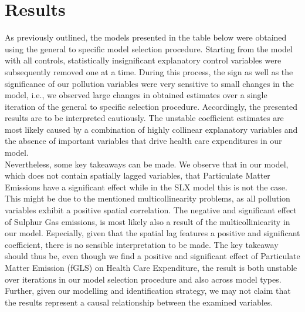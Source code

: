 \documentclass[]{article}
\begin{document}
\section{Results}
As previously outlined, the models presented in the table below were obtained using the general to specific model selection procedure. Starting from the model with all controls, statistically insignificant explanatory control variables were subsequently removed one at a time. During this process, the sign as well as the significance of our pollution variables were very sensitive to small changes in the model, i.e., we observed large changes in obtained estimates over a single iteration of the general to specific selection procedure. Accordingly, the presented results are to be interpreted cautiously. The unstable coefficient estimates are most likely caused by a combination of highly collinear explanatory variables and the absence of important variables that drive health care expenditures in our model.\\ Nevertheless, some key takeaways can be made. We observe that in our model, which does not contain spatially lagged variables, that Particulate Matter Emissions have a significant effect while in the SLX model this is not the case. This might be due to the mentioned multicollinearity problems, as all pollution variables exhibit a positive spatial correlation. The negative and significant effect of Sulphur Gas emissions, is most likely also a result of the multicolliniearity in our model. Especially, given that the spatial lag features a positive and significant coefficient, there is no sensible interpretation to be made. The key takeaway should thus be, even though we find a positive and significant effect of Particulate Matter Emission (fGLS) on Health Care Expenditure, the result is both unstable over iterations in our model selection procedure and also across model types. Further, given our modelling and identification strategy, we may not claim that the results represent a causal relationship between the examined variables.
\end{document}
